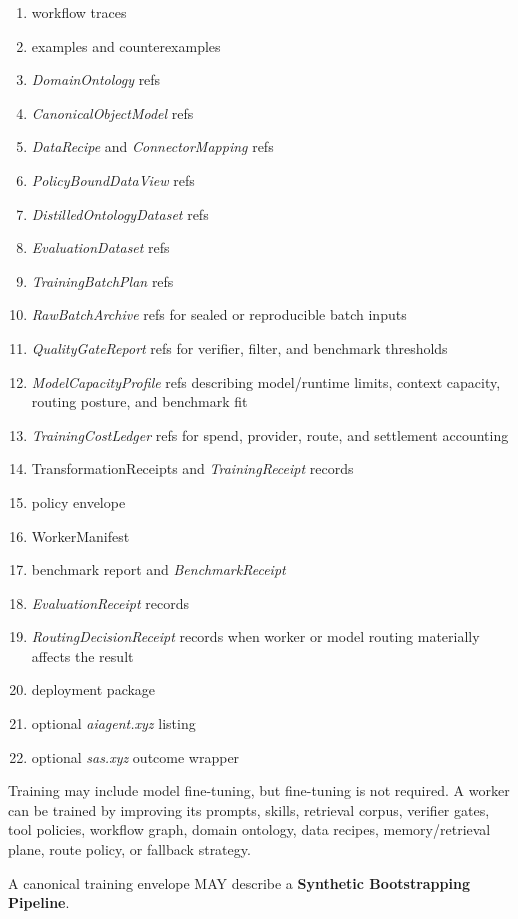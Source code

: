 \documentclass[
  11pt,
]{article}
\providecommand{\tightlist}{%
  \setlength{\itemsep}{0pt}\setlength{\parskip}{0pt}}
\begin{document}
\begin{enumerate}
\def\labelenumi{\arabic{enumi}.}
\tightlist
\item
  workflow traces
\item
  examples and counterexamples
\item
  \emph{DomainOntology} refs
\item
  \emph{CanonicalObjectModel} refs
\item
  \emph{DataRecipe} and \emph{ConnectorMapping} refs
\item
  \emph{PolicyBoundDataView} refs
\item
  \emph{DistilledOntologyDataset} refs
\item
  \emph{EvaluationDataset} refs
\item
  \emph{TrainingBatchPlan} refs
\item
  \emph{RawBatchArchive} refs for sealed or reproducible batch inputs
\item
  \emph{QualityGateReport} refs for verifier, filter, and benchmark
  thresholds
\item
  \emph{ModelCapacityProfile} refs describing model/runtime limits,
  context capacity, routing posture, and benchmark fit
\item
  \emph{TrainingCostLedger} refs for spend, provider, route, and
  settlement accounting
\item
  TransformationReceipts and \emph{TrainingReceipt} records
\item
  policy envelope
\item
  WorkerManifest
\item
  benchmark report and \emph{BenchmarkReceipt}
\item
  \emph{EvaluationReceipt} records
\item
  \emph{RoutingDecisionReceipt} records when worker or model routing
  materially affects the result
\item
  deployment package
\item
  optional \emph{aiagent.xyz} listing
\item
  optional \emph{sas.xyz} outcome wrapper
\end{enumerate}

Training may include model fine-tuning, but fine-tuning is not required.
A worker can be trained by improving its prompts, skills, retrieval
corpus, verifier gates, tool policies, workflow graph, domain ontology,
data recipes, memory/retrieval plane, route policy, or fallback
strategy.

A canonical training envelope MAY describe a \textbf{Synthetic
Bootstrapping Pipeline}.
\end{document}
